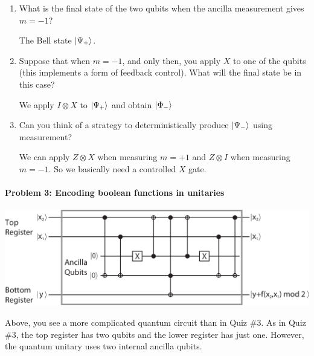 \documentclass[12pt]{article}
\newenvironment{answer}{\begingroup\setlength{\leftskip}{-\leftmargin}\begin{framed}}{\end{framed}\endgroup}
\begin{document}
\begin{enumerate}
    \item What is the final state of the two qubits when the ancilla measurement gives $m = -1$?

    \begin{answer}
        The Bell state $\ket{\Psi_+}$.
    \end{answer}

    \item Suppose that when $m = -1$, and only then, you apply $X$ to one of the qubits (this implements a form of feedback control). What will the final state be in this case?

    \begin{answer}
    	We apply $I \otimes X$ to $\ket{\Psi_+}$ and obtain $\ket{\Phi_-}$
    \end{answer}

    \item Can you think of a strategy to deterministically produce $\ket{\Psi_-}$ using measurement?

    \begin{answer}
    	We can apply $Z \otimes X$ when measuring $m = +1$ and $Z \otimes I$ when measuring $m = -1$. So we basically need a controlled $X$ gate. 
    \end{answer}
\end{enumerate}

\paragraph{Problem 3: Encoding boolean functions in unitaries}

\begin{center}\includegraphics[width=.6\textwidth]{problem-3.png}\end{center}

Above, you see a more complicated quantum circuit than in Quiz \#3. As in Quiz \#3, the top register has two qubits and the lower register has just one. However, the quantum unitary uses two internal ancilla qubits. 
\end{document}
